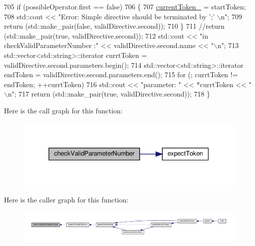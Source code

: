 \begin{DoxyCode}
705         \textcolor{keywordflow}{if} (possibleOperator.first == \textcolor{keyword}{false})
706         \{
707             \hyperlink{classft_1_1_parser_a942c5b794d108f144c5b5028aaa34cb6}{currentToken\_} = startToken;
708             std::cout << \textcolor{stringliteral}{"Error: Simple directive should be terminated by ';' \(\backslash\)n"};
709             \textcolor{keywordflow}{return} (std::make\_pair(\textcolor{keyword}{false}, validDirective.second));
710         \}
711         \textcolor{comment}{//return (std::make\_pair(true, validDirective.second));}
712         std::cout << \textcolor{stringliteral}{"in checkValidParameterNumber :"} << validDirective.second.name << \textcolor{stringliteral}{"\(\backslash\)n"};
713         std::vector<std::string>::iterator  currtToken = validDirective.second.parameters.begin();
714         std::vector<std::string>::iterator  endToken = validDirective.second.parameters.end();
715         \textcolor{keywordflow}{for} (; currtToken != endToken; ++currtToken)
716             std::cout << \textcolor{stringliteral}{"parameter: "} << *currtToken << \textcolor{stringliteral}{"\(\backslash\)n"};
717         \textcolor{keywordflow}{return} (std::make\_pair(\textcolor{keyword}{true}, validDirective.second));
718     \}
\end{DoxyCode}
Here is the call graph for this function\+:
\nopagebreak
\begin{figure}[H]
\begin{center}
\leavevmode
\includegraphics[width=333pt]{classft_1_1_parser_a31501116433b0b1f8d9d58f27658ea98_cgraph}
\end{center}
\end{figure}
Here is the caller graph for this function\+:
\nopagebreak
\begin{figure}[H]
\begin{center}
\leavevmode
\includegraphics[width=350pt]{classft_1_1_parser_a31501116433b0b1f8d9d58f27658ea98_icgraph}
\end{center}
\end{figure}
\mbox{\label{classft_1_1_parser_abcf864a160e3c4e1866edceae06b921b}} 
